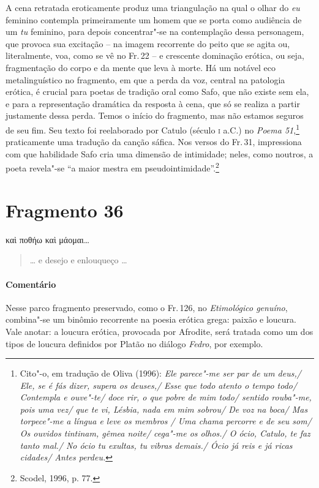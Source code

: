 {A cena retratada eroticamente produz uma triangulação na qual o olhar do \textit{eu}
feminino contempla primeiramente um homem que se porta como audiência de um
\textit{tu} feminino, para depois concentrar"-se na contemplação dessa
personagem, que provoca sua excitação -- na imagem recorrente do peito que se agita ou,
literalmente, voa, como se vê no Fr.\,22 -- e crescente dominação erótica, ou
seja, fragmentação do corpo e da mente que leva à morte. Há um notável eco
metalinguístico no fragmento, em que a perda da voz, central na patologia
erótica, é crucial para poetas de tradição oral como Safo, que não existe sem
ela, e para a representação dramática da resposta à cena, que só se realiza a
partir justamente dessa perda. Temos o início do fragmento, mas não estamos
seguros de seu fim. Seu texto foi reelaborado por Catulo (século \textsc{i}
a.C.) no \textit{Poema 51},\footnote{ Cito"-o, em tradução de Oliva (1996):
\textit{Ele parece"-me ser par de um deus,/ Ele, se é fás dizer, supera os
deuses,/ Esse que todo atento o tempo todo/ Contempla e ouve"-te/ doce rir, o
que pobre de mim todo/ sentido rouba"-me, pois uma vez/ que te vi, Lésbia,
nada em mim sobrou/ De voz na boca/ Mas torpece"-me a língua e leve os membros
/ Uma chama percorre e de seu som/ Os ouvidos tintinam, gêmea noite/ cega"-me
os olhos./ O ócio, Catulo, te faz tanto mal./ No ócio tu exultas, tu vibras
demais./ Ócio já reis e já ricas cidades/ Antes perdeu.}} praticamente uma
tradução da canção sáfica.
Nos versos do Fr.\,31, impressiona com que habilidade Safo cria uma dimensão de intimidade; neles, como noutros, a poeta revela"-se ``a maior mestra em pseudointimidade''.\footnote{Scodel, 1996, p. 77.}}



\pagebreak
\section{Fragmento 36}

\begin{gkverse}
καὶ ποθήω καὶ μάομαι\ldots{}
\end{gkverse}

\begin{verse}
\ldots{} e desejo e enlouqueço \ldots{}
\end{verse}

\medskip

{\paragraph{Comentário} Nesse parco fragmento preservado, como o Fr.\,126, no \textit{Etimológico genuíno}, combina"-se um binômio recorrente na poesia erótica grega:
paixão e loucura. Vale anotar: a loucura erótica, provocada por Afrodite, será
tratada como um dos tipos de loucura definidos por Platão
no diálogo \textit{Fedro}, por exemplo.}


